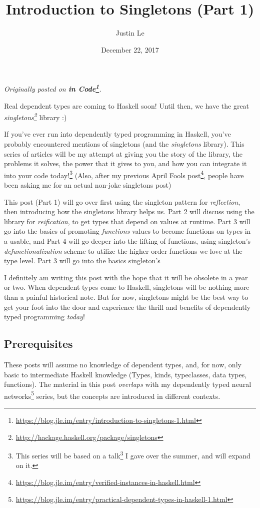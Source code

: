 \documentclass[]{article}
\title{Introduction to Singletons (Part 1)}
\author{Justin Le}
\date{December 22, 2017}
\renewcommand{\href}[2]{#2\footnote{\url{#1}}}
\begin{document}
\maketitle

\emph{Originally posted on
\textbf{\href{https://blog.jle.im/entry/introduction-to-singletons-1.html}{in
Code}}.}

Real dependent types are coming to Haskell soon! Until then, we have the great
\emph{\href{http://hackage.haskell.org/package/singletons}{singletons}} library
:)

If you've ever run into dependently typed programming in Haskell, you've
probably encountered mentions of singletons (and the \emph{singletons} library).
This series of articles will be my attempt at giving you the story of the
library, the problems it solves, the power that it gives to you, and how you can
integrate it into your code today!\footnote{This series will be based on
  \href{http://talks.jle.im/lambdaconf-2017/singletons/}{a talk} I gave over the
  summer, and will expand on it.} (Also, after
\href{https://blog.jle.im/entry/verified-instances-in-haskell.html}{my previous
April Fools post}, people have been asking me for an actual non-joke singletons
post)

This post (Part 1) will go over first using the singleton pattern for
\emph{reflection}, then introducing how the singletons library helps us. Part 2
will discuss using the library for \emph{reification}, to get types that depend
on values at runtime. Part 3 will go into the basics of promoting
\emph{functions} values to become functions on types in a usable, and Part 4
will go deeper into the lifting of functions, using singleton's
\emph{defunctionalization} scheme to utilize the higher-order functions we love
at the type level. Part 3 will go into the basics singleton's

I definitely am writing this post with the hope that it will be obsolete in a
year or two. When dependent types come to Haskell, singletons will be nothing
more than a painful historical note. But for now, singletons might be the best
way to get your foot into the door and experience the thrill and benefits of
dependently typed programming \emph{today}!

\hypertarget{prerequisites}{%
\subsection{Prerequisites}\label{prerequisites}}

These posts will assume no knowledge of dependent types, and, for now, only
basic to intermediate Haskell knowledge (Types, kinds, typeclasses, data types,
functions). The material in this post \emph{overlaps} with my
\href{https://blog.jle.im/entry/practical-dependent-types-in-haskell-1.html}{dependently
typed neural networks} series, but the concepts are introduced in different
contexts.
\end{document}
